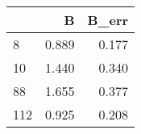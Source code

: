 \begin{tabular}{lrr}
\toprule
{} &     B &  B\_err \\
\midrule
8   & 0.889 &  0.177 \\
10  & 1.440 &  0.340 \\
88  & 1.655 &  0.377 \\
112 & 0.925 &  0.208 \\
\bottomrule
\end{tabular}
